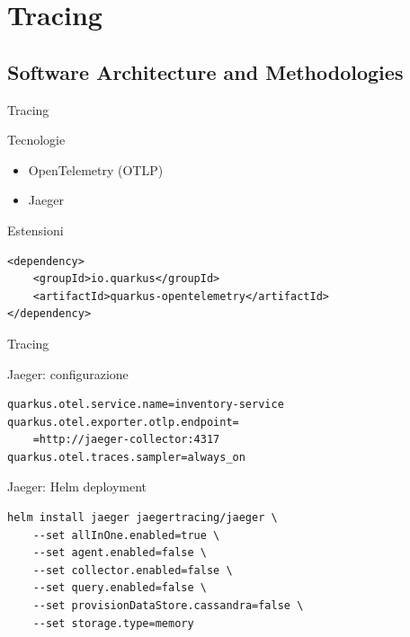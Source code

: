\section{Tracing}

\subsection{Software Architecture and Methodologies}

\begin{frame}[fragile]{Tracing}
    \begin{block}{Tecnologie}
        \begin{itemize}
            \item OpenTelemetry (OTLP)
            \item Jaeger
        \end{itemize}
    \end{block}
    \begin{block}{Estensioni}
        \begin{verbatim}
<dependency>
    <groupId>io.quarkus</groupId>
    <artifactId>quarkus-opentelemetry</artifactId>
</dependency>
        \end{verbatim}
    \end{block}
\end{frame}

\begin{frame}[fragile]{Tracing}
    \begin{block}{Jaeger: configurazione}
        \begin{verbatim}
quarkus.otel.service.name=inventory-service
quarkus.otel.exporter.otlp.endpoint=
    =http://jaeger-collector:4317
quarkus.otel.traces.sampler=always_on
        \end{verbatim}
    \end{block}
    \begin{block}{Jaeger: Helm deployment}
        \begin{verbatim}
helm install jaeger jaegertracing/jaeger \
    --set allInOne.enabled=true \
    --set agent.enabled=false \
    --set collector.enabled=false \
    --set query.enabled=false \
    --set provisionDataStore.cassandra=false \
    --set storage.type=memory
        \end{verbatim}
    \end{block}
\end{frame}

